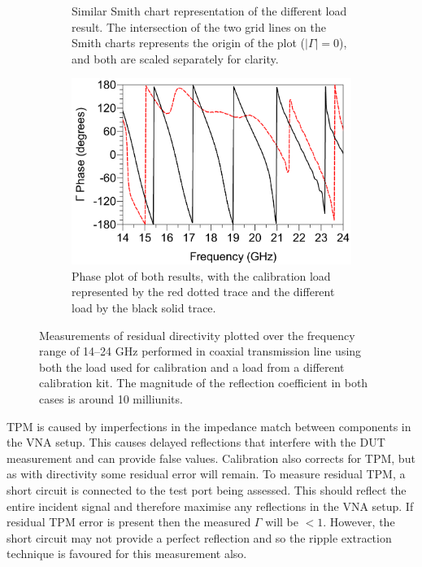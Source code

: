 \documentclass[../thesis/thesis.tex]{subfiles}
\begin{document}
\begin{figure}
\begin{subfigure}{0.45\textwidth}
	    \caption{Similar Smith chart representation of the different load result. The intersection of the two grid lines on the Smith charts represents the origin of the plot ($|\Gamma|=0$), and both are scaled separately for clarity.}
    \end{subfigure}
	\par\bigskip
	\begin{subfigure}{0.6\textwidth}
	    \centering
		\includegraphics[width=\linewidth]{dir-c.png}
		\caption{Phase plot of both results, with the calibration load represented by the red dotted trace and the different load by the black solid trace.}
	\end{subfigure}
	\caption[Measurements of residual directivity performed in coaxial transmission line.]{Measurements of residual directivity plotted over the frequency range of 14--24 GHz performed in coaxial transmission line using both the load used for calibration and a load from a different calibration kit. The magnitude of the reflection coefficient in both cases is around 10 milliunits.}
	\label{ch4_fig_dir}
\end{figure}

TPM is caused by imperfections in the impedance match between components in the VNA setup. This causes delayed reflections that interfere with the DUT measurement and can provide false values. Calibration also corrects for TPM, but as with directivity some residual error will remain. To measure residual TPM, a short circuit is connected to the test port being assessed. This should reflect the entire incident signal and therefore maximise any reflections in the VNA setup. If residual TPM error is present then the measured $\Gamma$ will be $<1$. However, the short circuit may not provide a perfect reflection and so the ripple extraction technique is favoured for this measurement also.
\end{document}
